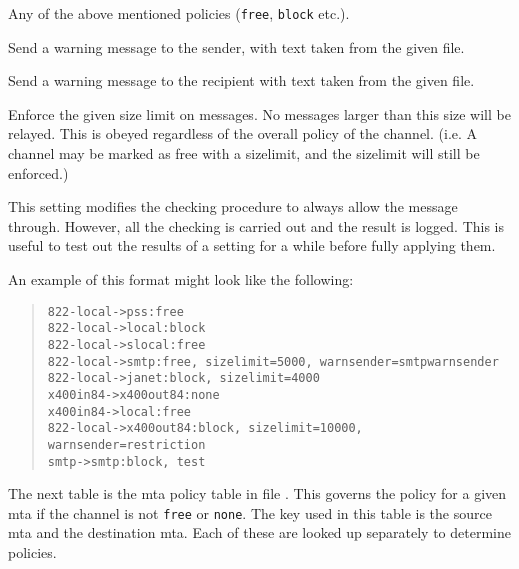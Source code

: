 \begin{describe}
\item[\verb|<policy>|:] Any of the above mentioned policies
(\verb|free|, \verb|block| etc.).

\item[\verb|warnsender=<file>|:]	Send a warning message to the sender,
with text taken from the given file.

\item[\verb|warnrecipient=<file>|:]	Send a warning message to the
recipient with text taken from the given file.

\item[\verb|sizelimit=<digits>|:]	Enforce the given size
limit on messages. No messages larger than this size will be relayed.
This is obeyed regardless of the overall policy of the channel. (i.e.
A channel may be marked as free with a sizelimit, and the sizelimit
will still be enforced.)

\item[\verb|test|:] This setting modifies the checking procedure to
always allow the message through. However, all the checking is carried
out and the result is logged. This is useful to test out the results
of a setting for a while before fully applying them.
\end{describe}

An example of this format might look like the following:
\begin{quote}\small\begin{verbatim}
822-local->pss:free
822-local->local:block
822-local->slocal:free
822-local->smtp:free, sizelimit=5000, warnsender=smtpwarnsender
822-local->janet:block, sizelimit=4000
x400in84->x400out84:none
x400in84->local:free
822-local->x400out84:block, sizelimit=10000, warnsender=restriction
smtp->smtp:block, test
\end{verbatim}\end{quote}

The next table is the mta policy table in file . This
governs the policy for a given mta if the channel is not \verb|free|
or \verb|none|. The key used in this table is the source mta and
the destination mta. Each of these are looked up separately to
determine policies.

